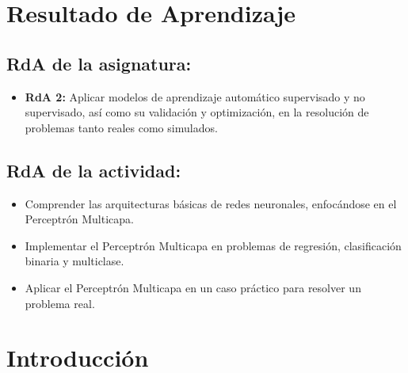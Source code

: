 \documentclass[a4,11pt]{aleph-notas}
\begin{document}
\encabezado


\section*{Resultado de Aprendizaje}

\subsection*{RdA de la asignatura:}
\begin{itemize}[leftmargin=*]
    \item \textbf{RdA 2:} Aplicar modelos de aprendizaje automático supervisado y no supervisado, así como su validación y optimización, en la resolución de problemas tanto reales como simulados.
\end{itemize}

\subsection*{RdA de la actividad:}
\begin{itemize}[leftmargin=*]
    \item Comprender las arquitecturas básicas de redes neuronales, enfocándose en el Perceptrón Multicapa.
    \item Implementar el Perceptrón Multicapa en problemas de regresión, clasificación binaria y multiclase.
    \item Aplicar el Perceptrón Multicapa en un caso práctico para resolver un problema real.
\end{itemize}

\section*{Introducción}
\end{document}
